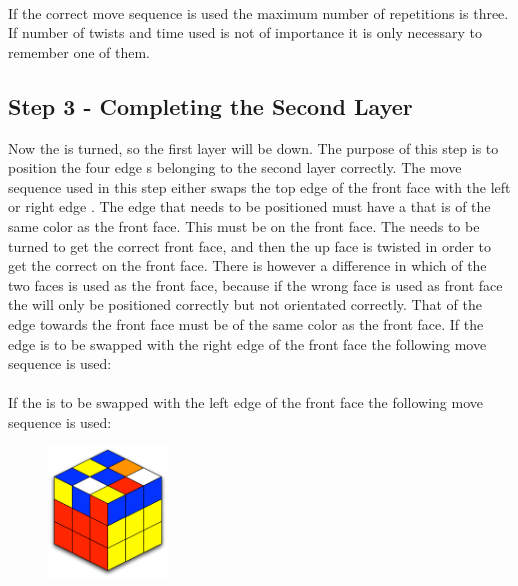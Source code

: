  \\

If the correct move sequence is used the maximum number of repetitions is three. If number of twists and time used is not of importance it is only necessary to remember one of them.


\subsection{Step 3 - Completing the Second Layer}\label{sub:step3}
Now the \cube{} is turned, so the first layer will be down. 
The purpose of this step is to position the four edge \cpiece{}s belonging to the second layer correctly. 
The move sequence used in this step either swaps the top edge \cpiece{} of the front face with the left or right edge \cpiece{}. 
The edge \cpiece{} that needs to be positioned must have a \facelet{} that is of the same color as the front face. This \facelet{} must be on the front face. 
The \cube{} needs to be turned to get the correct front face, and then the up face is twisted in order to get the correct \cpiece{} on the front face. 
There is however a difference in which of the two faces is used as the front face, because if the wrong face is used as front face the \cpiece{} will only be positioned correctly but not orientated correctly. 
That \facelet{} of the edge towards the front face must be of the same color as the front face. 
If the edge \cpiece{} is to be swapped with the right edge \cpiece{} of the front face the following move sequence is used: \\

 \\

If the \cpiece{} is to be swapped with the left edge \cpiece{} of the front face the following move sequence is used: \\

\begin{figure}
\vspace{-5mm}
\begin{center}
	\includegraphics[width=0.28\textwidth]{input/pics/3F2L.pdf}	
\end{center}
\caption{}
\vspace{-5mm}
\label{fig:3F2L}
\end{figure}

